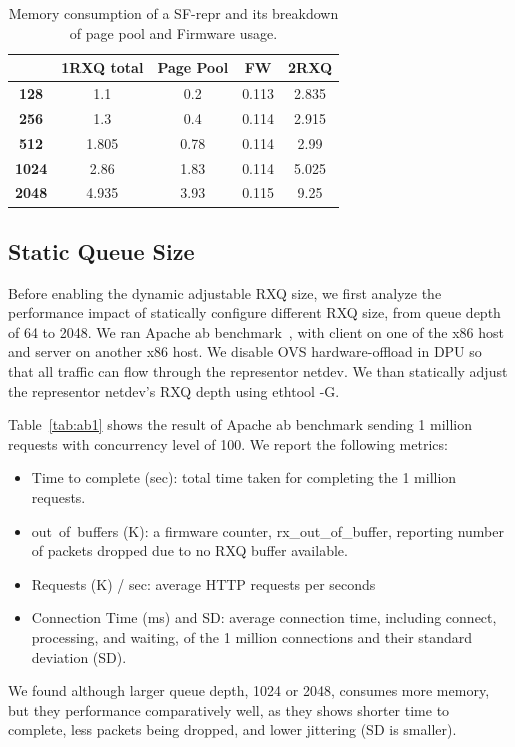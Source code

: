 \documentclass[letterpaper]{article}
\begin{document}
\begin{table}[h!]
\centering
\footnotesize

\begin{tabular}{|c|c|c|c|c|}
\hline
\textbf{} & \textbf{1RXQ total} & \textbf{Page Pool} & \textbf{FW} & \textbf{2RXQ} \\ \hline \hline
\textbf{128}  & 1.1   & 0.2  & 0.113 & 2.835 \\ \hline
\textbf{256}  & 1.3   & 0.4  & 0.114 & 2.915 \\ \hline
\textbf{512}  & 1.805 & 0.78 & 0.114 & 2.99  \\ \hline
\textbf{1024} & 2.86  & 1.83 & 0.114 & 5.025 \\ \hline
\textbf{2048} & 4.935 & 3.93 & 0.115 & 9.25  \\ \hline
\end{tabular}
\caption{Memory consumption of a SF-repr and its breakdown of page pool and Firmware usage.}
\label{tab:memory}
\end{table}

\subsection{Static Queue Size}
Before enabling the dynamic adjustable RXQ size, we first analyze the performance impact
of statically configure different RXQ size, from queue depth of 64 to 2048.
We ran Apache ab benchmark~\cite{ab}, with client on one of the x86 host and
server on another x86 host. We disable OVS hardware-offload in DPU so that all traffic
can flow through the representor netdev. We than statically adjust the representor
netdev's RXQ depth using ethtool -G. 

Table~\ref{tab:ab1} shows the result of Apache ab benchmark sending 1 million requests
with concurrency level of 100. We report the following metrics:
\begin{itemize}
    \item Time to complete (sec): total time taken for completing the 1 million requests.
    \item out\ of\ buffers (K): a firmware counter, rx\_out\_of\_buffer, reporting number of packets dropped due to no RXQ buffer available.
    \item Requests (K) / sec: average HTTP requests per seconds
    \item Connection Time (ms) and SD: average connection time, including connect, processing, and waiting, of the 1 million connections and their standard deviation (SD).
\end{itemize}
We found although larger queue depth, 1024 or 2048, consumes more memory, but they
performance comparatively well, as they shows shorter time to complete, less packets
being dropped, and lower jittering (SD is smaller).
\end{document}
